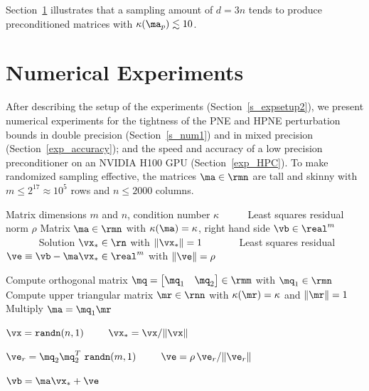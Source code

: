 \documentclass[final]{siamart220329}%
\begin{document}
Section~\ref{s_num} illustrates that a sampling amount of $d=3n$ tends to produce preconditioned matrices with $\kappa(\ma_p)\lesssim 10$.
 
\section{Numerical Experiments}\label{s_num}
After describing the setup of the  experiments (Section~\ref{s_expsetup2}), we present numerical experiments for the tightness of the PNE and HPNE perturbation bounds 
in double precision (Section~\ref{s_num1})
and in mixed precision (Section~\ref{exp_accuracy}); and the speed and accuracy of a low precision
preconditioner on an NVIDIA H100 GPU (Section~\ref{exp_HPC}).
To make randomized sampling effective, the 
 matrices $\ma\in\rmn$ are tall and skinny with $m\leq 2^{17}\approx10^5$ rows and $n\leq 2000$ columns.





\begin{algorithm}[!t]
\caption{Constructing exact least squares problems}\label{alg_exact}
\begin{algorithmic}
\Require Matrix dimensions $m$ and $n$, condition number $\kappa$
\State $\qquad\ $  Least squares residual norm $\rho$
\Ensure Matrix $\ma\in\rmn$ with $\kappa(\ma)=\kappa$,
right hand side $\vb\in\real^m$
\State $\qquad\quad$ Solution $\vx_*\in\rn$ with $\|\vx_*\|=1$
\State $\qquad\quad$ Least squares residual $\ve\equiv \vb-\ma\vx_*\in\real^m$
with $\|\ve\|=\rho$ 
\medskip

\State {}
\State Compute orthogonal matrix $\mq=\begin{bmatrix}\mq_1&\mq_2\end{bmatrix}\in\rmm$ with $\mq_1\in\rmn$
\State Compute upper triangular matrix $\mr\in\rnn$ with $\kappa(\mr)=\kappa$ and $\|\mr\|=1$
\State Multiply $\ma=\mq_1\mr\qquad$
\medskip

\State {}
\State $\vx = \texttt{randn}(n, 1)\qquad$ 
\State $\vx_*=\vx/\|\vx\|$
\medskip

\State {}
\State $\ve_r= \mq_2\mq_2^T\ \texttt{randn}(m,1)\qquad$
\State $\ve = \rho\,\ve_{r}/\|\ve_{r}\|\qquad$
 \medskip
 
\State $\vb = \ma\vx_*+\ve\qquad $
\end{algorithmic}
\end{algorithm}
\end{document}
